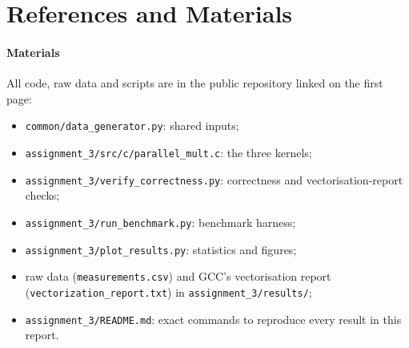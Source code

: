 \documentclass[conference,a4paper]{IEEEtran}
\newcommand{\code}[1]{\texttt{#1}}
\begin{document}
\section*{References and Materials}

\paragraph{Materials} All code, raw data and scripts are in the public
repository linked on the first page:
\begin{itemize}[itemsep=0pt, topsep=2pt, leftmargin=1.2em]
  \item \code{common/data\_generator.py}: shared inputs;
  \item \code{assignment\_3/src/c/parallel\_mult.c}: the three kernels;
  \item \code{assignment\_3/verify\_correctness.py}: correctness and
        vectorisation-report checks;
  \item \code{assignment\_3/run\_benchmark.py}: benchmark harness;
  \item \code{assignment\_3/plot\_results.py}: statistics and figures;
  \item raw data (\code{measurements.csv}) and GCC's vectorisation report
        (\code{vectorization\_report.txt}) in \code{assignment\_3/results/};
  \item \code{assignment\_3/README.md}: exact commands to reproduce every
        result in this report.
\end{itemize}
\end{document}
